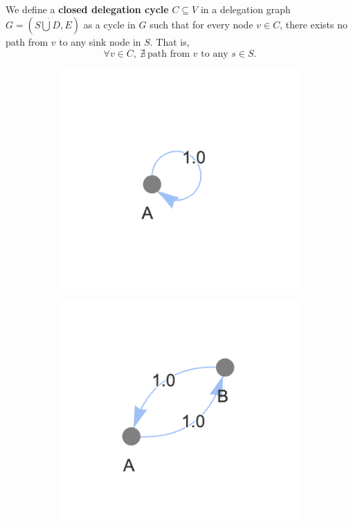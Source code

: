 We define a \textbf{closed delegation cycle} $C \subseteq V$ in a delegation graph $G = (S \dot\bigcup D, E)$ as a cycle in $G$ such that for every node $v \in C$, there exists no path from $v$ to any sink node in $S$. That is,
\[
\forall v \in C,\ \nexists\ \text{path from } v \text{ to any } s \in S.
\]

\begin{figure}[h]
    \centering
    \begin{subfigure}[t]{0.32\textwidth}
        \centering
        \includegraphics[width=\textwidth]{invalid_graph_1}
    \end{subfigure}
    \hfill
    \begin{subfigure}[t]{0.32\textwidth}
        \centering
        \includegraphics[width=\textwidth]{invalid_graph_2}

\end{subfigure}
\end{figure}
